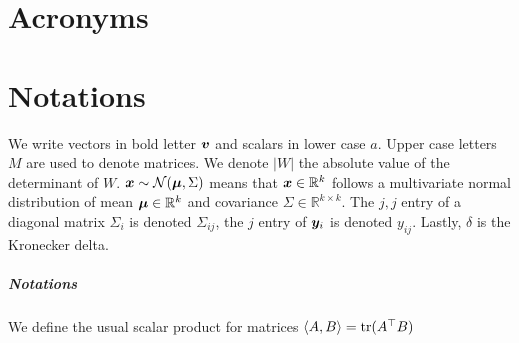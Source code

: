     \chapter*{Acronyms}
    \begin{acronym}[UMLX]
    \end{acronym}

    \chapter*{Notations}
    We write vectors in bold letter $\boldsymbol{v}$ and scalars in lower case $a$. Upper case letters $M$ are used to denote
    matrices. We denote $|W|$ the absolute value of the determinant of $W$. $\boldsymbol{x} \sim \mathcal{N}(\boldsymbol{\mu}, \Sigma)$ means that $\boldsymbol{x} \in \mathbb{R}^k$ follows
    a multivariate normal distribution of mean $\boldsymbol{\mu} \in \mathbb{R}^k$ and
    covariance $\Sigma \in \mathbb{R}^{k \times k}$. The $j, j$ entry of a diagonal matrix $\Sigma_i$ is denoted $\Sigma_{ij}$, the $j$ entry of $\boldsymbol{y}_i$ is denoted $y_{ij}$. Lastly, $\delta$ is the Kronecker delta.
    
    \paragraph{Notations} We define the usual scalar product for matrices $\langle A , B\rangle = \mathop{\mathrm{tr}}(A^{\top} B)$
\endgroup
